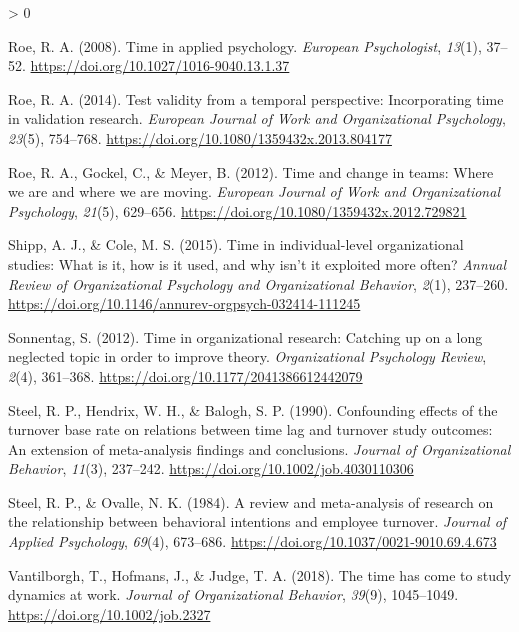 \documentclass[
12pt, %
twoside,
english]{guelphthesis}
\newlength{\cslhangindent}
\newenvironment{CSLReferences}[2] %
 {%
  \setlength{\parindent}{0pt}
  \ifodd #1 \everypar{\setlength{\hangindent}{\cslhangindent}}\ignorespaces\fi
  \ifnum #2 > 0
  \setlength{\parskip}{\linespacing{2}}
  \fi
 }%
 {}
\begin{document}
\begin{CSLReferences}{1}{0}
\leavevmode{}%
Roe, R. A. (2008). Time in applied psychology. \emph{European Psychologist}, \emph{13}(1), 37--52. \url{https://doi.org/10.1027/1016-9040.13.1.37}

\leavevmode{}%
Roe, R. A. (2014). Test validity from a temporal perspective: Incorporating time in validation research. \emph{European Journal of Work and Organizational Psychology}, \emph{23}(5), 754--768. \url{https://doi.org/10.1080/1359432x.2013.804177}

\leavevmode{}%
Roe, R. A., Gockel, C., \& Meyer, B. (2012). Time and change in teams: Where we are and where we are moving. \emph{European Journal of Work and Organizational Psychology}, \emph{21}(5), 629--656. \url{https://doi.org/10.1080/1359432x.2012.729821}

\leavevmode{}%
Shipp, A. J., \& Cole, M. S. (2015). Time in individual-level organizational studies: What is it, how is it used, and why isn{'}t it exploited more often? \emph{Annual Review of Organizational Psychology and Organizational Behavior}, \emph{2}(1), 237--260. \url{https://doi.org/10.1146/annurev-orgpsych-032414-111245}

\leavevmode{}%
Sonnentag, S. (2012). Time in organizational research: Catching up on a long neglected topic in order to improve theory. \emph{Organizational Psychology Review}, \emph{2}(4), 361--368. \url{https://doi.org/10.1177/2041386612442079}

\leavevmode{}%
Steel, R. P., Hendrix, W. H., \& Balogh, S. P. (1990). Confounding effects of the turnover base rate on relations between time lag and turnover study outcomes: An extension of meta-analysis findings and conclusions. \emph{Journal of Organizational Behavior}, \emph{11}(3), 237--242. \url{https://doi.org/10.1002/job.4030110306}

\leavevmode{}%
Steel, R. P., \& Ovalle, N. K. (1984). A review and meta-analysis of research on the relationship between behavioral intentions and employee turnover. \emph{Journal of Applied Psychology}, \emph{69}(4), 673--686. \url{https://doi.org/10.1037/0021-9010.69.4.673}

\leavevmode{}%
Vantilborgh, T., Hofmans, J., \& Judge, T. A. (2018). The time has come to study dynamics at work. \emph{Journal of Organizational Behavior}, \emph{39}(9), 1045--1049. \url{https://doi.org/10.1002/job.2327}


\end{CSLReferences}
\end{document}
